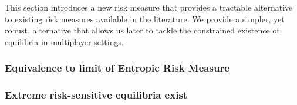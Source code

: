 This section introduces a new risk measure that provides a tractable alternative to existing risk measures available in the literature. We provide a simpler, yet robust, alternative that allows us later to tackle the constrained existence of equilibria in multiplayer settings.




\subsubsection*{Equivalence to limit of Entropic Risk Measure}


\subsubsection*{Extreme risk-sensitive equilibria exist}









